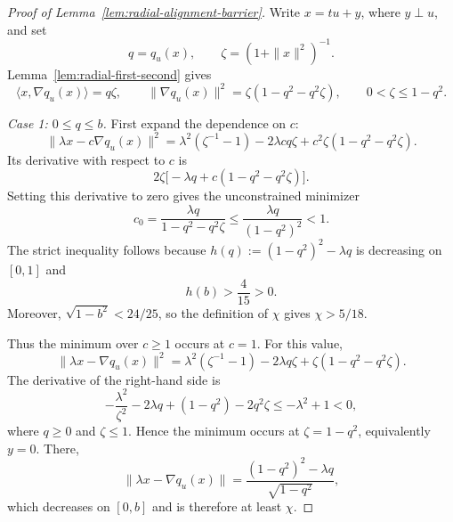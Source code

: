 \documentclass{article}
\theoremstyle{definition}
\begin{document}
\begin{proof}[Proof of Lemma~\ref{lem:radial-alignment-barrier}]
Write $x=tu+y$, where $y\perp u$, and set
\begin{equation}
 q=q_u(x),\qquad
 \zeta=(1+\|x\|^2)^{-1}.
\end{equation}
Lemma~\ref{lem:radial-first-second} gives
\begin{equation}
 \langle x,\nabla q_u(x)\rangle=q\zeta,
 \qquad
 \|\nabla q_u(x)\|^2
 =\zeta(1-q^2-q^2\zeta),
 \qquad
 0<\zeta\le1-q^2.
 \label{eq:radial-scalar-identities}
\end{equation}

\emph{Case 1: $0\le q\le b$.}
First expand the dependence on $c$:
\begin{equation}
 \|\lambda x-c\nabla q_u(x)\|^2
 =\lambda^2(\zeta^{-1}-1)-2\lambda cq\zeta
  +c^2\zeta(1-q^2-q^2\zeta).
\label{eq:radial-c-quadratic}
\end{equation}
Its derivative with respect to $c$ is
\begin{equation}
 2\zeta\bigl[-\lambda q+c(1-q^2-q^2\zeta)\bigr].
 \label{eq:radial-c-derivative}
\end{equation}
Setting this derivative to zero gives the unconstrained minimizer
\begin{equation}
 c_0=\frac{\lambda q}{1-q^2-q^2\zeta}
 \le\frac{\lambda q}{(1-q^2)^2}<1.
\end{equation}
The strict inequality follows because
$h(q):=(1-q^2)^2-\lambda q$ is decreasing on $[0,1]$ and
\begin{equation}
 h(b)>\frac4{15}>0.
 \label{eq:stationary-margin}
\end{equation}
Moreover, $\sqrt{1-b^2}<24/25$, so the definition of $\chi$ gives
$\chi>5/18$.

Thus the minimum over $c\ge1$ occurs at $c=1$.  For this value,
\begin{equation}
 \|\lambda x-\nabla q_u(x)\|^2
 =\lambda^2(\zeta^{-1}-1)-2\lambda q\zeta
 +\zeta(1-q^2-q^2\zeta).
\end{equation}
The derivative of the right-hand side is
\begin{equation}
 -\frac{\lambda^2}{\zeta^2}-2\lambda q+(1-q^2)-2q^2\zeta
 \le-\lambda^2+1<0,
\end{equation}
where $q\ge0$ and $\zeta\le1$.  Hence the minimum
occurs at $\zeta=1-q^2$, equivalently $y=0$.  There,
\begin{equation}
 \|\lambda x-\nabla q_u(x)\|
 =\frac{(1-q^2)^2-\lambda q}{\sqrt{1-q^2}},
\end{equation}
which decreases on $[0,b]$ and is therefore at least $\chi$.


\end{proof}
\end{document}
